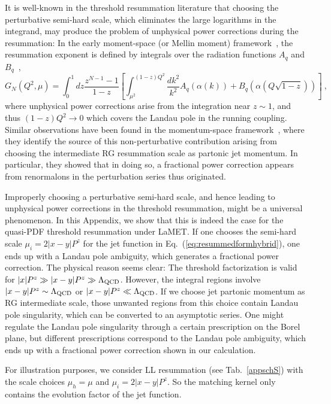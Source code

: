 \documentclass[a4paper,11pt]{article}
\begin{document}
It is well-known in the threshold resummation literature that choosing the perturbative semi-hard scale, which eliminates the large logarithms in the integrand, may produce the problem of unphysical power corrections during the resummation: 
In the early moment-space (or Mellin moment) framework~\cite{Catani:1996yz,Vogt:1999xa,Beneke:1995pq,Korchemsky:1993uz}, the resummation exponent is defined by integrals over the radiation functions $A_q$ and $B_q$\ , 
\begin{equation}
G_N\left(Q^2, \mu\right)=\int_0^1 d z \frac{z^{N-1}-1}{1-z}\left[\int_{\mu^2}^{(1-z) Q^2} \frac{d k^2}{k^2} A_q\left(\alpha(k)\right)+B_q\left(\alpha(Q \sqrt{1-z})\right)\right] \ ,
\end{equation}
where unphysical power corrections arise from the integration near $z\sim 1$, and thus $(1-z)Q^2\to 0$ which covers the Landau pole in the running coupling. Similar observations have been found in the momentum-space framework~\cite{Becher:2006mr}, where they identify the source of this non-perturbative contribution arising from choosing the intermediate RG resummation scale as partonic jet momentum. In particular, they showed that in doing so, a fractional power correction
appears from renormalons in the perturbation series thus originated. 

Improperly choosing a perturbative semi-hard scale, and hence leading to unphysical power corrections in the threshold resummation, might be a universal phenomenon. 
In this Appendix, we show that this is indeed the case for the quasi-PDF threshold resummation under LaMET. If one chooses the semi-hard scale $\mu_i = 2|x-y| P^z$ for the jet function in Eq.~(\ref{eq:resummedformhybrid}), one ends up with a Landau pole ambiguity, which generates a fractional power correction. The physical reason seems clear:
The threshold factorization is valid for $|x| P^z \gg |x-y| P^z \gg \Lambda_{\rm QCD}$. However, the integral regions involve $ |x-y| P^z \sim \Lambda_{\rm QCD}$ or $ |x-y| P^z \ll \Lambda_{\rm QCD}$. If we choose jet partonic momentum as RG intermediate scale, those unwanted regions from this choice contain Landau pole singularity, which can be converted to an asymptotic series. One might regulate the Landau pole singularity through a certain prescription on the Borel plane, but different prescriptions correspond to the Landau pole ambiguity, which ends up with a fractional power correction shown in our calculation.

For illustration purposes, we consider LL resummation (see Tab.~\ref{appschS}) with the scale choices $\mu_h = \mu$ and $\mu_i = 2|x-y| P^z$. So the matching kernel only contains the evolution factor of the jet function. 
\end{document}
